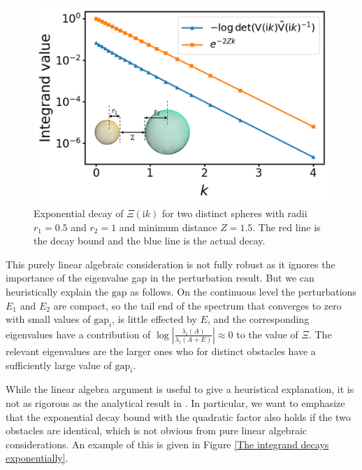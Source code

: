 \begin{figure}[H]
    \centering
    \includegraphics[scale = 0.7]{figures/Scalar_integ_decay_unequal.png}
    \caption{Exponential decay of $\Xi(\textrm{i}k)$ for two distinct spheres with radii $r_{1} = 0.5$ and $r_{2} = 1$ and minimum distance $Z=1.5$. The red line is the decay bound and the blue line is the actual decay.}
    \label{Distinct:The integrand decays exponentially}
\end{figure}

This purely linear algebraic consideration is not fully robust as it ignores the importance of the eigenvalue gap in the perturbation result. But we can 
heuristically explain the $\text{gap}$ as follows. On the continuous level the perturbations $E_1$ and $E_2$ are compact, so the tail end of the spectrum 
that converges to zero with small values of $\text{gap}_i$, is little effected by $E$, and the corresponding eigenvalues have a contribution of 
$\log \left|\frac{\lambda_i(A)}{\lambda_i(A+E)}\right| \approx 0$ to the value of $\Xi$. The relevant eigenvalues are the larger ones who for distinct obstacles 
have a sufficiently large value of $\text{gap}_i$.

While the linear algebra argument is useful to give a heuristical explanation, it is not as rigorous as the analytical result in \cite{fang2022trace}. In particular, we want to emphasize that the exponential decay bound with the quadratic factor also holds if the two obstacles are identical, which is not obvious from pure linear algebraic considerations. An example of this is given in Figure \ref{The integrand decays exponentially}.

